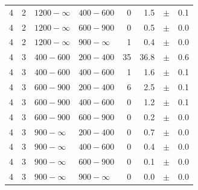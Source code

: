 \begin{table}[!h]
\begin{tabular}{rrllrrcl}
4 & 2 & $1200- \infty$ & $400-600$ &      0 &      1.5 &$\pm$&    0.1 \\
4 & 2 & $1200- \infty$ & $600-900$ &      0 &      0.5 &$\pm$&    0.0 \\
4 & 2 & $1200- \infty$ & $900-\infty$ &      1 &      0.4 &$\pm$&    0.0 \\
4 & 3 & $ 400- 600$ & $200-400$ &     35 &     36.8 &$\pm$&    0.6 \\
4 & 3 & $ 400- 600$ & $400-600$ &      1 &      1.6 &$\pm$&    0.1 \\
4 & 3 & $ 600- 900$ & $200-400$ &      6 &      2.5 &$\pm$&    0.1 \\
4 & 3 & $ 600- 900$ & $400-600$ &      0 &      1.2 &$\pm$&    0.1 \\
4 & 3 & $ 600- 900$ & $600-900$ &      0 &      0.2 &$\pm$&    0.0 \\
4 & 3 & $ 900- \infty$ & $200-400$ &      0 &      0.7 &$\pm$&    0.0 \\
4 & 3 & $ 900- \infty$ & $400-600$ &      0 &      0.4 &$\pm$&    0.0 \\
4 & 3 & $ 900- \infty$ & $600-900$ &      0 &      0.1 &$\pm$&    0.0 \\
4 & 3 & $ 900- \infty$ & $900-\infty$ &      0 &      0.0 &$\pm$&    0.0 \\
    \hline
  \end{tabular}
\end{table}

